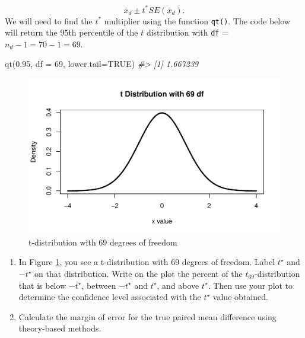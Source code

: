 \documentclass[
]{report}
\newenvironment{Shaded}{\begin{snugshade}}{\end{snugshade}}
\newcommand{\AttributeTok}[1]{\textcolor[rgb]{0.77,0.63,0.00}{#1}}
\newcommand{\CommentTok}[1]{\textcolor[rgb]{0.56,0.35,0.01}{\textit{#1}}}
\newcommand{\ConstantTok}[1]{\textcolor[rgb]{0.00,0.00,0.00}{#1}}
\newcommand{\DecValTok}[1]{\textcolor[rgb]{0.00,0.00,0.81}{#1}}
\newcommand{\FloatTok}[1]{\textcolor[rgb]{0.00,0.00,0.81}{#1}}
\newcommand{\FunctionTok}[1]{\textcolor[rgb]{0.00,0.00,0.00}{#1}}
\newcommand{\NormalTok}[1]{#1}
\begin{document}
\[\bar{x}_d\pm t^* SE(\bar{x}_d).\]
We will need to find the \(t^*\) multiplier using the function \texttt{qt()}. The code below will return the 95th percentile of the \(t\) distribution with \texttt{df} = \(n_d - 1 = 70 - 1 = 69\).

\begin{Shaded}
\begin{Highlighting}[]
\FunctionTok{qt}\NormalTok{(}\FloatTok{0.95}\NormalTok{, }\AttributeTok{df =} \DecValTok{69}\NormalTok{, }\AttributeTok{lower.tail=}\ConstantTok{TRUE}\NormalTok{)}
\CommentTok{\#\textgreater{} [1] 1.667239}
\end{Highlighting}
\end{Shaded}

\begin{figure}

{\centering \includegraphics[width=0.7\linewidth]{11-OCA08-paired-theory_files/figure-latex/tstar-1} 

}

\caption{t-distribution with 69 degrees of freedom}\label{fig:tstar}
\end{figure}

\begin{enumerate}
\def\labelenumi{\arabic{enumi}.}
\setcounter{enumi}{9}
\item
  In Figure \ref{fig:tstar}, you see a t-distribution with 69 degrees of freedom. Label \(t^\star\) and \(-t^\star\) on that distribution. Write on the plot the percent of the \(t_{69}\)-distribution that is below \(-t^\star\), between \(-t^\star\) and \(t^\star\), and above \(t^\star\). Then use your plot to determine the confidence level associated with the \(t^\star\) value obtained.
  \vspace{0.3in}
\item
  Calculate the margin of error for the true paired mean difference using theory-based methods.
\end{enumerate}
\end{document}
